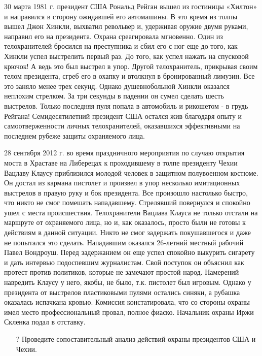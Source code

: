 \documentclass[a4paper,12pt,fleqn]{article} %
\begin{document}
\begin{tcolorbox}[colback=blue!55!red!5!,colframe=blue!55!red,enforce breakable,%
	pad at break=1mm, title=Кейс 29. Инциденты при охране физических лиц]

30 марта 1981 г. президент США Рональд Рейган вышел из гостиницы «Хилтон» и направился в сторону ожидавшей его автомашины. В это время из толпы вышел Джон Хинкли, выхватил револьвер и, удерживая оружие двумя руками, направил его на президента. Охрана среагировала мгновенно. Один из телохранителей бросился на преступника и сбил его с ног еще до того, как Хинкли успел выстрелить первый раз. До того, как успел нажать на спусковой крючок! А ведь это был выстрел в упор. Другой телохранитель, прикрывая своим телом президента, сгреб его в охапку и втолкнул в бронированный лимузин. Все это заняло менее трех секунд. Однако душевнобольной Хинкли оказался неплохим стрелком. За три секунды в падении он сумел сделать шесть выстрелов. Только последняя пуля попала в автомобиль и рикошетом - в грудь Рейгана! Семидесятилетний президент США остался жив благодаря опыту и самоотверженности личных телохранителей, оказавшихся эффективными на последнем рубеже защиты охраняемого лица. 

28 сентября 2012 г. во время праздничного мероприятия по случаю открытия моста в Храставе на Либерецах к проходившему в толпе президенту Чехии Вацлаву Клаусу приблизился молодой человек в защитном полувоенном костюме. Он достал из кармана пистолет и произвел в упор несколько имитационных выстрелов в правую руку и бок президента. Все произошло настолько быстро, что никто не смог помешать нападавшему. Стрелявший повернулся и спокойно ушел с места происшествия. Телохранители Вацлава Клауса не только отстали на маршруте от охраняемого лица, но и, как оказалось, просто были не готовы к действиям в данной ситуации. Никто не смог задержать покушавшегося и даже не попытался это сделать. Нападавшим оказался 26-летний местный рабочий Павел Вондроуш. Перед задержанием он еще успел спокойно выкурить сигарету и дать интервью подоспевшим журналистам. Свой поступок он объяснил как протест против политиков, которые не замечают простой народ. Намерений навредить Клаусу у него, якобы, не было, т.к. пистолет был игровым. Однако у президента от выстрелов пластиковыми пулями остались синяки, а рубашка оказалась испачкана кровью. Комиссия констатировала, что со стороны охраны имел место профессиональный провал, полное фиаско. Начальник охраны Иржи Скленка подал в отставку.

\begin{itemize}
	\item[{\color{blue!55!red}\Huge {  $ ? $}} \quad]   Проведите сопоставительный анализ действий охраны президентов США и Чехии.
\end{itemize}	

\end{tcolorbox}
\end{document}
